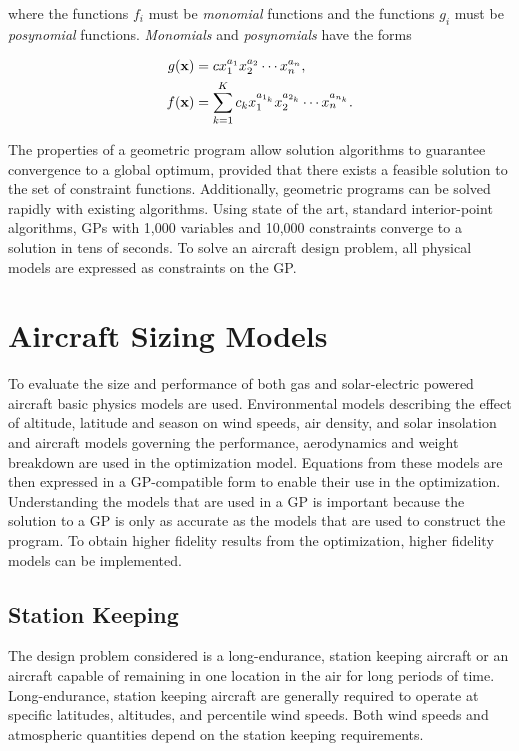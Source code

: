 \documentclass[]{aiaa-tc}%
\begin{document}
where the functions $f_i$ must be \emph{monomial} functions and the functions $g_i$ must be \emph{posynomial} functions. \emph{Monomials} and \emph{posynomials} have the forms

\begin{align}
 \label{e:mon}
g(\bold{x}) &= c x_1^{a_1} x_2^{a_2} \dotsm x_n^{a_n} , \\
\label{e:pos}
f(\bold{x}) &= \displaystyle\sum_{k=1}^K c_k x_1^{a_{1_k}} x_2^{a_{2_k}} \dotsm x_n^{a_{n_k}}.
\end{align}

The properties of a geometric program allow solution algorithms to guarantee convergence to a global optimum, provided that there exists a feasible solution to the set of constraint functions.  
Additionally, geometric programs can be solved rapidly with existing algorithms.  
Using state of the art, standard interior-point algorithms, GPs with 1,000 variables and 10,000 constraints converge to a solution in tens of seconds.\cite{gp}  
To solve an aircraft design problem, all physical models are expressed as constraints on the GP.\cite{hoburgthesis} \\

\section{Aircraft Sizing Models}

To evaluate the size and performance of both gas and solar-electric powered aircraft basic physics models are used.  
Environmental models describing the effect of altitude, latitude and season on wind speeds, air density, and solar insolation and aircraft models governing the performance, aerodynamics and weight breakdown are used in the optimization model.
Equations from these models are then expressed in a GP-compatible form to enable their use in the optimization. 
Understanding the models that are used in a GP is important because the solution to a GP is only as accurate as the models that are used to construct the program.  
To obtain higher fidelity results from the optimization, higher fidelity models can be implemented. 

\subsection{Station Keeping} 

The design problem considered is a long-endurance, station keeping aircraft or an aircraft capable of remaining in one location in the air for long periods of time. Long-endurance, station keeping aircraft are generally required to operate at specific latitudes, altitudes, and percentile wind speeds. Both wind speeds and atmospheric quantities depend on the station keeping requirements. 
\end{document}
